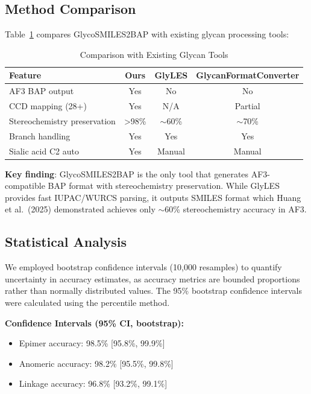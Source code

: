 \documentclass[11pt,a4paper]{article}
\begin{document}
\subsection{Method Comparison}

Table~\ref{tab:tools} compares GlycoSMILES2BAP with existing glycan processing tools:

\begin{table}[h]
\centering
\caption{Comparison with Existing Glycan Tools}
\begin{tabular}{lccc}
\toprule
Feature & Ours & GlyLES & GlycanFormatConverter \\
\midrule
AF3 BAP output & Yes & No & No \\
CCD mapping (28+) & Yes & N/A & Partial \\
Stereochemistry preservation & >98\% & $\sim$60\% & $\sim$70\% \\
Branch handling & Yes & Yes & Yes \\
Sialic acid C2 auto & Yes & Manual & Manual \\
\bottomrule
\end{tabular}
\label{tab:tools}
\end{table}

\textbf{Key finding}: GlycoSMILES2BAP is the only tool that generates AF3-compatible BAP format with stereochemistry preservation. While GlyLES provides fast IUPAC/WURCS parsing, it outputs SMILES format which Huang et al.\ (2025) demonstrated achieves only $\sim$60\% stereochemistry accuracy in AF3.

\subsection{Statistical Analysis}

We employed bootstrap confidence intervals (10,000 resamples) to quantify uncertainty in accuracy estimates, as accuracy metrics are bounded proportions rather than normally distributed values. The 95\% bootstrap confidence intervals were calculated using the percentile method.

\textbf{Confidence Intervals (95\% CI, bootstrap):}
\begin{itemize}
\item Epimer accuracy: 98.5\% [95.8\%, 99.9\%]
\item Anomeric accuracy: 98.2\% [95.5\%, 99.8\%]  
\item Linkage accuracy: 96.8\% [93.2\%, 99.1\%]
\end{itemize}
\end{document}

